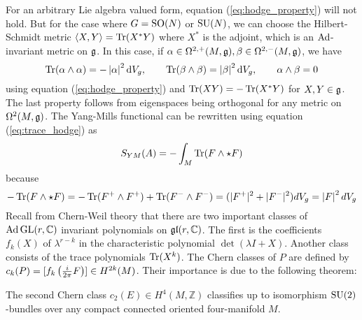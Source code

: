 For an arbitrary Lie algebra valued form, equation (\ref{eq:hodge_property})
will not hold. But for the case where $G=\operatorname{SO}(N)$ or  $\operatorname{SU}(N)$, we can choose the
Hilbert-Schmidt metric  $\gen{X,Y}=\Tr(X^*Y)$ where $X^*$ is the adjoint, which
is an $\operatorname{Ad}$-invariant metric on $\operatorname{\mathfrak{g}}$.  In this case, if 
$\alpha \in \Omega^{2,+}(M,\operatorname{\mathfrak{g}}), \beta \in \Omega^{2,-}(M,\operatorname{\mathfrak{g}})$, we have
\begin{equation} \label{eq:trace_hodge}
\Tr(\alpha\wedge \alpha) = -\abs{\alpha}^2 \odif{V}_g, \qquad
\Tr(\beta\wedge \beta) = \abs{\beta}^2 \odif{V}_g, \qquad
\alpha\wedge \beta = 0
\end{equation}
using equation (\ref{eq:hodge_property}) and $\operatorname{Tr}(XY) = -\operatorname{Tr}(X^*Y)$ for
$X,Y\in\operatorname{\mathfrak{g}}$. The last property follows from eigenspaces being orthogonal for any
metric on $\Omega^2(M,\operatorname{\mathfrak{g}})$. 
The Yang-Mills functional can be rewritten using equation (\ref{eq:trace_hodge}) as
\[
	S_{YM}(A) 
	=-\int_M \operatorname{Tr} (F\wedge \star F) 
\] 
because 
\[
-\Tr(F\wedge \star F) = - \Tr(F^+\wedge F^+) + \Tr(F^-\wedge F^-)
= (\abs[*]{F^+}^2+\abs[*]{F^-}^2) dV_g = \abs{F}^2 dV_g
\] 
\noindent
Recall from Chern-Weil theory that there are two important classes of
$\operatorname{Ad} \operatorname{GL}(r,\mathbb{C})$ invariant polynomials on $\operatorname{\mathfrak{gl}}(r,\mathbb{C})$. 
The first is the coefficients $f_k(X)$ of $\lambda^{r-k}$ in the characteristic
polynomial $\det(\lambda I + X)$. Another class consists of the trace
polynomials $\operatorname{Tr}(X^k)$. 
The Chern classes of $P$ are defined by $c_k(P) =
[f_k\paren{\frac{i}{2\pi}F}] \in H^{2k}(M)$. Their importance is due to the
following theorem:
\begin{thm}
	The second Chern class $c_2(E)\in H^4(M,\mathbb{Z})$ classifies up to
	isomorphism $\operatorname{SU}(2)$-bundles over any compact connected oriented 
	four-manifold $M$. 
\end{thm}

